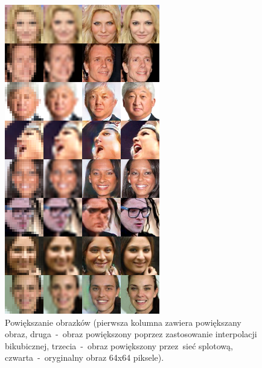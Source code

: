 \documentclass[oneside, 11pt, a4paper]{article}
\begin{document}
\begin{multicols}{2}
\begin{figure}[H]
	\centering
	\includegraphics[width=0.9\linewidth, keepaspectratio]{img/srez_sample_output.png}
	\vspace{-2mm}
	\caption{Powiększanie obrazków (pierwsza kolumna zawiera powiększany obraz, druga~-~obraz powiększony poprzez zastosowanie interpolacji bikubicznej, trzecia~-~obraz powiększony przez~sieć splotową, czwarta~-~oryginalny obraz 64x64 piksele).}
	\label{fig:superresolution}
\end{figure}
\vspace{-0.3cm}

\end{multicols}
\end{document}

